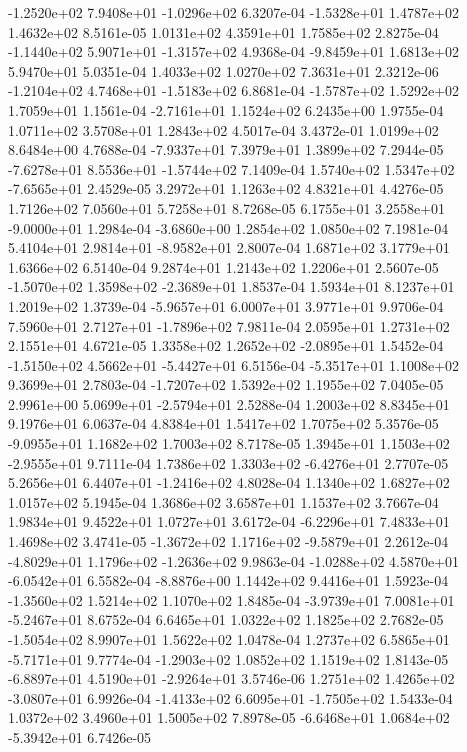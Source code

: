 -1.2520e+02  7.9408e+01 -1.0296e+02  6.3207e-04
-1.5328e+01  1.4787e+02  1.4632e+02  8.5161e-05
1.0131e+02 4.3591e+01 1.7585e+02  2.8275e-04
-1.1440e+02  5.9071e+01 -1.3157e+02  4.9368e-04
-9.8459e+01  1.6813e+02  5.9470e+01  5.0351e-04
1.4033e+02 1.0270e+02 7.3631e+01  2.3212e-06
-1.2104e+02  4.7468e+01 -1.5183e+02  6.8681e-04
-1.5787e+02  1.5292e+02  1.7059e+01  1.1561e-04
-2.7161e+01  1.1524e+02  6.2435e+00  1.9755e-04
1.0711e+02 3.5708e+01 1.2843e+02  4.5017e-04
3.4372e-01 1.0199e+02 8.6484e+00  4.7688e-04
-7.9337e+01  7.3979e+01  1.3899e+02  7.2944e-05
-7.6278e+01  8.5536e+01 -1.5744e+02  7.1409e-04
 1.5740e+02  1.5347e+02 -7.6565e+01  2.4529e-05
3.2972e+01 1.1263e+02 4.8321e+01  4.4276e-05
1.7126e+02 7.0560e+01 5.7258e+01  8.7268e-05
 6.1755e+01  3.2558e+01 -9.0000e+01  1.2984e-04
-3.6860e+00  1.2854e+02  1.0850e+02  7.1981e-04
 5.4104e+01  2.9814e+01 -8.9582e+01  2.8007e-04
1.6871e+02 3.1779e+01 1.6366e+02  6.5140e-04
9.2874e+01 1.2143e+02 1.2206e+01  2.5607e-05
-1.5070e+02  1.3598e+02 -2.3689e+01  1.8537e-04
1.5934e+01 8.1237e+01 1.2019e+02  1.3739e-04
-5.9657e+01  6.0007e+01  3.9771e+01  9.9706e-04
 7.5960e+01  2.7127e+01 -1.7896e+02  7.9811e-04
2.0595e+01 1.2731e+02 2.1551e+01  4.6721e-05
 1.3358e+02  1.2652e+02 -2.0895e+01  1.5452e-04
-1.5150e+02  4.5662e+01 -5.4427e+01  6.5156e-04
-5.3517e+01  1.1008e+02  9.3699e+01  2.7803e-04
-1.7207e+02  1.5392e+02  1.1955e+02  7.0405e-05
 2.9961e+00  5.0699e+01 -2.5794e+01  2.5288e-04
1.2003e+02 8.8345e+01 9.1976e+01  6.0637e-04
4.8384e+01 1.5417e+02 1.7075e+02  5.3576e-05
-9.0955e+01  1.1682e+02  1.7003e+02  8.7178e-05
 1.3945e+01  1.1503e+02 -2.9555e+01  9.7111e-04
 1.7386e+02  1.3303e+02 -6.4276e+01  2.7707e-05
 5.2656e+01  6.4407e+01 -1.2416e+02  4.8028e-04
1.1340e+02 1.6827e+02 1.0157e+02  5.1945e-04
1.3686e+02 3.6587e+01 1.1537e+02  3.7667e-04
1.9834e+01 9.4522e+01 1.0727e+01  3.6172e-04
-6.2296e+01  7.4833e+01  1.4698e+02  3.4741e-05
-1.3672e+02  1.1716e+02 -9.5879e+01  2.2612e-04
-4.8029e+01  1.1796e+02 -1.2636e+02  9.9863e-04
-1.0288e+02  4.5870e+01 -6.0542e+01  6.5582e-04
-8.8876e+00  1.1442e+02  9.4416e+01  1.5923e-04
-1.3560e+02  1.5214e+02  1.1070e+02  1.8485e-04
-3.9739e+01  7.0081e+01 -5.2467e+01  8.6752e-04
6.6465e+01 1.0322e+02 1.1825e+02  2.7682e-05
-1.5054e+02  8.9907e+01  1.5622e+02  1.0478e-04
 1.2737e+02  6.5865e+01 -5.7171e+01  9.7774e-04
-1.2903e+02  1.0852e+02  1.1519e+02  1.8143e-05
-6.8897e+01  4.5190e+01 -2.9264e+01  3.5746e-06
 1.2751e+02  1.4265e+02 -3.0807e+01  6.9926e-04
-1.4133e+02  6.6095e+01 -1.7505e+02  1.5433e-04
1.0372e+02 3.4960e+01 1.5005e+02  7.8978e-05
-6.6468e+01  1.0684e+02 -5.3942e+01  6.7426e-05
